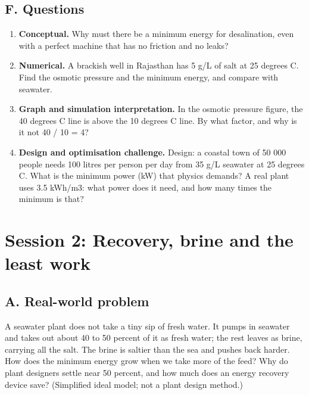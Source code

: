 \documentclass[11pt,a4paper]{article}
\begin{document}
\subsection*{F. Questions}
\begin{enumerate}[nosep]
\item \textbf{Conceptual.} Why must there be a minimum energy for desalination, even with a perfect machine that has no friction and no leaks?
\item \textbf{Numerical.} A brackish well in Rajasthan has 5 g/L of salt at 25 degrees C. Find the osmotic pressure and the minimum energy, and compare with seawater.
\item \textbf{Graph and simulation interpretation.} In the osmotic pressure figure, the 40 degrees C line is above the 10 degrees C line. By what factor, and why is it not 40 / 10 = 4?
\item \textbf{Design and optimisation challenge.} Design: a coastal town of 50 000 people needs 100 litres per person per day from 35 g/L seawater at 25 degrees C. What is the minimum power (kW) that physics demands? A real plant uses 3.5 kWh/m3: what power does it need, and how many times the minimum is that?
\end{enumerate}

\section{Session 2: Recovery, brine and the least work}

\subsection*{A. Real-world problem}
A seawater plant does not take a tiny sip of fresh water. It pumps in seawater and takes out about 40 to 50 percent of it as fresh water; the rest leaves as brine, carrying all the salt. The brine is saltier than the sea and pushes back harder. How does the minimum energy grow when we take more of the feed? Why do plant designers settle near 50 percent, and how much does an energy recovery device save? (Simplified ideal model; not a plant design method.)
\end{document}
